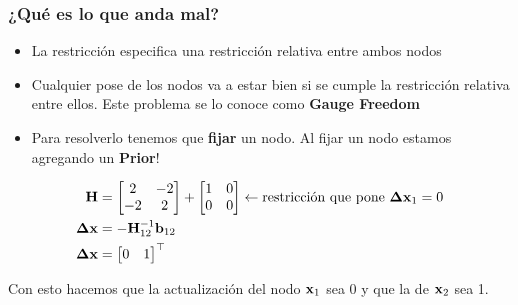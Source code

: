 \begin{frame}
    \frametitle{¿Qué es lo que anda mal?}
    
    \begin{itemize}
        \item La restricción especifica una restricción relativa entre ambos nodos
        \item Cualquier pose de los nodos va a estar bien si se cumple la restricción relativa entre ellos. Este problema se lo conoce como {\bf Gauge Freedom}
        \item Para resolverlo tenemos que {\bf fijar} un nodo. Al fijar un nodo estamos agregando un {\bf Prior}!
    \end{itemize}

    \begin{align*}
        \boldsymbol{\mathbf{H}} &=
        \begin{bmatrix}
            2 & -2\\
            -2 & 2
        \end{bmatrix}
        +
        \begin{bmatrix}
            1 & 0\\
            0 & 0
        \end{bmatrix} \leftarrow \text{restricción que pone } \boldsymbol{\mathbf{\Delta}}\boldsymbol{\mathbf{x}}_{1} = 0\\
        \boldsymbol{\mathbf{\Delta}}\boldsymbol{\mathbf{x}} &= -{\boldsymbol{\mathbf{H}}}^{-1}_{12} \boldsymbol{\mathbf{b}}_{12}\\
        \boldsymbol{\mathbf{\Delta}}\boldsymbol{\mathbf{x}} &=
        \begin{bmatrix}
            0 & 1
        \end{bmatrix}^{\top}
    \end{align*}
    
    Con esto hacemos que la actualización del nodo $\boldsymbol{\mathbf{x}}_{1}$ sea 0 y que la de $\boldsymbol{\mathbf{x}}_{2}$ sea 1.
\end{frame}

